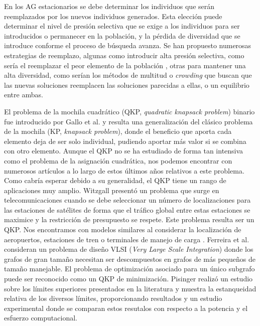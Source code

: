 En los AG estacionarios se debe determinar los individuos que serán reemplazados por los nuevos individuos generados. 
Esta elección puede determinar el nivel de presión selectiva que se exige a los individuos para ser introducidos o permanecer en la población, y la pérdida de diversidad que se introduce conforme el proceso de búsqueda avanza. 
Se han propuesto numerosas estrategias de reemplazo, algunas como introducir alta presión selectiva, como sería el reemplazar el peor elemento de la población \parencite{goldbergComparativeAnalysisSelection1991}, otras para mantener una alta diversidad, como serían los métodos de multitud o \textit{crowding} \parencite{mahfoudCrowdingPreselectionRevisited1992} que buscan que las nuevas soluciones reemplacen las soluciones parecidas a ellas, o un equilibrio entre ambas. 


El problema de la mochila cuadrático (QKP, \textit{quadratic knapsack problem}) binario fue introducido por Gallo et al. \parencite{galloQuadraticKnapsackProblems1980} y resulta una generalización del clásico problema de la mochila (KP, \textit{knapsack problem}), donde el beneficio que aporta cada elemento deja de ser solo individual, pudiendo aportar más valor si se combina con otro elemento. 
Aunque el QKP no se ha estudiado de forma tan intensiva como el problema de la asignación cuadrática, nos podemos encontrar con numerosos artículos a lo largo de estos últimos años relativos a este problema. 
Como cabría esperar debido a su generalidad, el QKP tiene un rango de aplicaciones muy amplio. 
Witzgall \parencite{witzgallMathematicalMethodsSite1975} presentó un problema que surge en telecomunicaciones cuando se debe seleccionar un número de localizaciones para las estaciones de satélites de forma que el tráfico global entre estas estaciones se maximice y la restricción de presupuesto se respete. 
Este problema resulta ser un QKP. 
Nos encontramos con modelos similares al considerar la localización de aeropuertos, estaciones de tren o terminales de manejo de carga \parencite{rhysSelectionProblemShared1970}. 
Ferreira et al. \parencite{ferreiraFormulationsValidInequalities1996} consideran un problema de diseño VLSI (\textit{Very Large Scale Integration}) donde los grafos de gran tamaño necesitan ser descompuestos en grafos de más pequeños de tamaño manejable. 
El problema de optimización asociado para un único subgrafo puede ser reconocido como un QKP de minimización. 
Pisinger \parencite{pisingerQuadraticKnapsackProblem2007} realizó un estudio sobre los límites superiores presentados en la literatura y muestra la estanqueidad relativa de los diversos límites, proporcionando resultados y un estudio experimental donde se comparan estos resutalos con respecto a la potencia y el esfuerzo computacional. 


